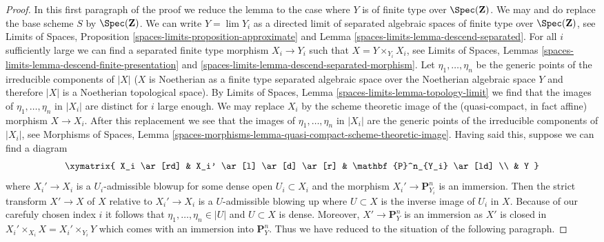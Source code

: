 \begin{proof}
In this first paragraph of the proof we reduce the lemma to the case
where $Y$ is of finite type over $\Spec(\mathbf{Z})$.
We may and do replace the base scheme $S$ by $\Spec(\mathbf{Z})$.
We can write $Y = \lim Y_i$ as a directed limit of separated
algebraic spaces of finite type over $\Spec(\mathbf{Z})$, see
Limits of Spaces, Proposition \ref{spaces-limits-proposition-approximate} and
Lemma \ref{spaces-limits-lemma-descend-separated}.
For all $i$ sufficiently large we can find a separated finite type morphism
$X_i \to Y_i$ such that $X = Y \times_{Y_i} X_i$, see
Limits of Spaces, Lemmas
\ref{spaces-limits-lemma-descend-finite-presentation} and
\ref{spaces-limits-lemma-descend-separated-morphism}.
Let $\eta_1, \ldots, \eta_n$ be the generic points of the irreducible
components of $|X|$ ($X$ is Noetherian as a finite type separated
algebraic space over the Noetherian algebraic space $Y$ and therefore
$|X|$ is a Noetherian topological space).
By Limits of Spaces, Lemma \ref{spaces-limits-lemma-topology-limit}
we find that the images of $\eta_1, \ldots, \eta_n$ in $|X_i|$
are distinct for $i$ large enough. We may replace
$X_i$ by the scheme theoretic image of the (quasi-compact, in fact affine)
morphism $X \to X_i$.
After this replacement we see that the images
of $\eta_1, \ldots, \eta_n$ in $|X_i|$ are the generic points of the
irreducible components of $|X_i|$, see
Morphisms of Spaces, Lemma
\ref{spaces-morphisms-lemma-quasi-compact-scheme-theoretic-image}.
Having said this, suppose we can find a diagram
$$
\xymatrix{
X_i \ar[rd] & X_i' \ar[l] \ar[d] \ar[r] & \mathbf{P}^n_{Y_i} \ar[ld] \\
& Y
}
$$
where $X_i' \to X_i$ is a $U_i$-admissible blowup for some dense open
$U_i \subset X_i$ and the morphism $X_i' \to \mathbf{P}^n_{Y_i}$
is an immersion. Then the strict transform $X' \to X$ of $X$ relative
to $X_i' \to X_i$ is a $U$-admissible blowing up where $U \subset X$
is the inverse image of $U_i$ in $X$. Because of our carefuly chosen
index $i$ it follows that $\eta_1, \ldots, \eta_n \in |U|$ and
$U \subset X$ is dense. Moreover, $X' \to \mathbf{P}^n_Y$ is an
immersion as $X'$ is closed in
$X_i' \times_{X_i} X = X_i' \times_{Y_i} Y$
which comes with an immersion into $\mathbf{P}^n_Y$. Thus we have reduced
to the situation of the following paragraph.


\end{proof}
